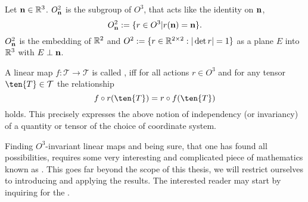 \begin{definition}
	Let $\mathbf{n}\in \mathbb{R}^3$. $O^2_{\mathbf{n}}$ is the subgroup of $O^3$, that acts like the identity on $\mathbf{n}$,  \[O^2_{\mathbf{n}}:=\{r\in O^3 | r(\mathbf{n}) = \mathbf{n} \}.\] 
	$O^2_{\mathbf{n}}$  is the embedding of $\mathbb{R}^2$ and $O^2:= \{r\in\mathbb{R}^{2\times 2}: |\det r| = 1\}$ as a plane $E$ into $\mathbb{R}^3$ with $E\perp\mathbf{n}$.
\end{definition}


\begin{definition}
	A linear map $f: \mathcal{T}\to \mathcal{T}$ is called , iff for all actions $r\in O^3$  and for any tensor $\ten{T}\in\mathcal{T}$ the relationship
	\[f \circ r (\ten{T}) = r \circ f (\ten{T})\]
	holds. This precisely expresses the above notion of independency (or invariancy) of a quantity or tensor of the choice of coordinate system.
\end{definition}
Finding $O^3$-invariant linear maps and being sure, that one has found all possibilities, requires some very interesting and complicated piece of mathematics known as . This goes far beyond the scope of this thesis, we will restrict ourselves to introducing and applying the results. The interested reader may start by inquiring for the . 

